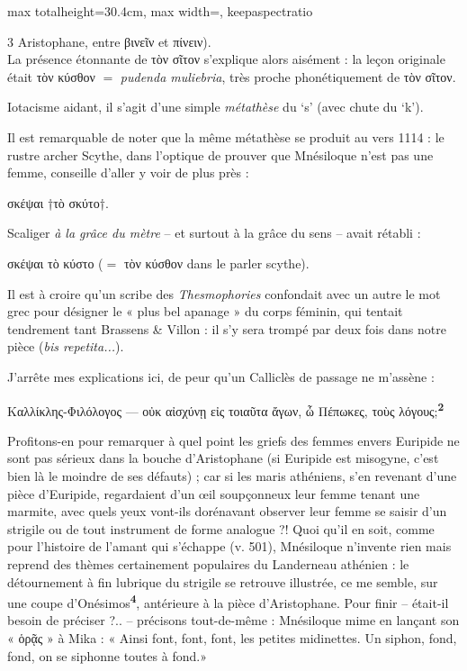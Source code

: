 \documentclass[11pt,twoside]{book}
\newcommand{\italique}[1]{\textit{#1}}
\newcommand{\citComm}[1]{\begin{quoting}[vskip=0.4pt,leftmargin=0.7em,rightmargin=0.2em]#1\end{quoting}}
\newcommand{\latin}[1]{\textit{#1}}
\newcommand{\marqueur}[1]{\textsuperscript{\color{rubricRed}\textbf{#1}}}
\begin{document}
\begin{adjustbox}{max totalheight=30.4cm, max width=\textwidth, keepaspectratio}
\begin{minipage}{\textwidth}
{\begin{multicols}{3}
Aristophane, entre βινεῖν et πίνειν).\\ La présence étonnante de τὸν σῖτον s'explique alors aisément : la leçon originale était τὸν κύσθον $=$ \latin{pudenda muliebria}, très proche phonétiquement de τὸν σῖτον.
\par\vspace{1.5pt}
\noindent Iotacisme aidant, il s'agit d'une simple \italique{métathèse} du `s' (avec chute du `k').
\par\vspace{1.5pt}
\noindent Il est remarquable de noter que la même métathèse se produit au vers 1114 : le rustre archer Scythe, dans l'optique de prouver que Mnésiloque n'est pas une femme, conseille d'aller y voir de plus près :
\citComm{σκέψαι †τὸ σκύτο†.}
\par\vspace{1.5pt}
\noindent Scaliger \italique{à la grâce du mètre} -- et surtout à la grâce du sens -- avait rétabli :
\citComm{σκέψαι τὸ κύστο ($=$ τὸν κύσθον dans le parler scythe).}
\par\vspace{1.5pt}
\noindent Il est à croire qu'un scribe des \italique{Thesmophories} confondait avec un autre le mot grec pour désigner le « plus bel apanage » du corps féminin, qui tentait tendrement tant Brassens \& Villon : il s'y sera trompé par deux fois dans notre pièce (\latin{bis repetita...}).
\par\vspace{1.5pt}
\noindent J'arrête mes explications ici, de peur qu'un Calliclès de passage ne m'assène :
\citComm{Καλλίκλης-Φιλόλογος --- οὐκ αἰσχύνῃ εἰς τοιαῦτα ἄγων, ὦ Πέπωκες, τοὺς λόγους;\marqueur{2}}
\par\vspace{1.5pt}
\noindent Profitons-en pour remarquer à quel point les griefs des femmes envers Euripide ne sont pas sérieux dans la bouche d'Aristophane (si Euripide est misogyne, c'est bien là le moindre de ses défauts) ; car si les maris athéniens, s'en revenant d'une pièce d'Euripide, regardaient d'un œil soupçonneux leur femme tenant une marmite, avec quels yeux vont-ils dorénavant observer leur femme se saisir d'un strigile ou de tout instrument de forme analogue ?! Quoi qu'il en soit, comme pour l'histoire de l'amant qui s'échappe (v. 501), Mnésiloque n'invente rien mais reprend des thèmes certainement populaires du Landerneau athénien : le détournement à fin lubrique du strigile se retrouve illustrée, ce me semble, sur une coupe d'Onésimos\marqueur{4}, antérieure à la pièce d'Aristophane. Pour finir – était-il besoin de préciser ?.. – précisons tout-de-même : Mnésiloque mime en lançant son « ὁρᾷς » à Mika : « Ainsi font, font, font, les petites midinettes. Un siphon, fond, fond, on se siphonne toutes à fond.»

\end{multicols}}
\end{minipage}
\end{adjustbox}
\end{document}
